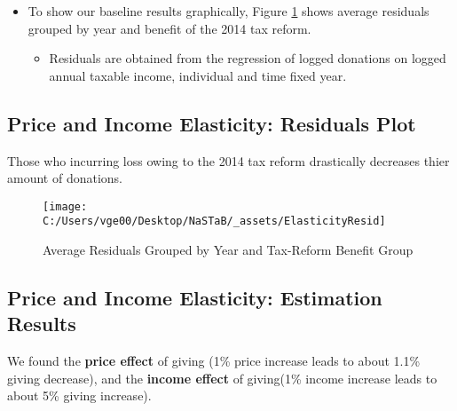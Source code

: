 \documentclass[ review  , 3p ]{elsarticle}
\providecommand{\tightlist}{%
  \setlength{\itemsep}{0pt}\setlength{\parskip}{0pt}}
\begin{document}
  \begin{itemize}
  \tightlist
  \item
    To show our baseline results graphically, Figure \ref{fig:showElasticityResid} shows average residuals grouped by year and benefit of the 2014 tax reform.
  
    \begin{itemize}
    \tightlist
    \item
      Residuals are obtained from the regression of logged donations on logged annual taxable income, individual and time fixed year.
    \end{itemize}
  \end{itemize}
  
  \hypertarget{price-and-income-elasticity-residuals-plot}{%
  \subsection{Price and Income Elasticity: Residuals Plot}\label{price-and-income-elasticity-residuals-plot}}
  
  Those who incurring loss owing to the 2014 tax reform drastically decreases thier amount of donations.
  
  \begin{figure}
  
  {\centering \texttt{[image: C:/Users/vge00/Desktop/NaSTaB/\_assets/ElasticityResid]} 
  
  }
  
  \caption{Average Residuals Grouped by Year and Tax-Reform Benefit Group}\label{fig:showElasticityResid}
  \end{figure}
  
  \hypertarget{price-and-income-elasticity-estimation-results}{%
  \subsection{Price and Income Elasticity: Estimation Results}\label{price-and-income-elasticity-estimation-results}}
  
  We found the \textbf{price effect} of giving (1\% price increase leads to about 1.1\% giving decrease),
  and the \textbf{income effect} of giving(1\% income increase leads to about 5\% giving increase).
  
\end{document}
